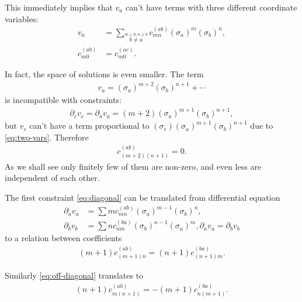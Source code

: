 \documentclass[aps,prd,final,twocolumn,floats,floatfix,nofootinbib,10pt]{revtex4-1}
\begin{document}
This immediately implies that $v_a$ can't have terms with three different
coordinate variables:
\begin{align}
  v_a & = \sum_{\overset{m \geq 0, n \geq 0}{b \neq a}}
  c^{(ab)}_{mn} (\sigma_a)^m (\sigma_b)^n, \\
  c^{(ab)}_{m0} & = c^{(ac)}_{m0}.
\end{align}

In fact, the space of solutions is even smaller. The term
\begin{align}
  v_a = (\sigma_a)^{m + 2} (\sigma_b)^{n + 1} + \cdots
\end{align}
is incompatible with constraints:
\begin{align}
  \partial_c v_c = \partial_a v_a =
    (m + 2) (\sigma_a)^{m + 1} (\sigma_b)^{n + 1},
\end{align}
but $v_c$ can't have a term proportional to
$(\sigma_c) (\sigma_a)^{m + 1} (\sigma_b)^{n + 1}$ due to \eqref{eq:two-vars}.
Therefore
\begin{align} \label{eq:corner}
  c^{(ab)}_{(m + 2)(n + 1)} = 0.
\end{align}
As we shall see only finitely few of them are non-zero, and even less
are independent of each other.

The first constraint \eqref{eq:diagonal} can be translated from differential
equation
\begin{align}
  \partial_a v_a & = \sum m c^{(ab)}_{mn} (\sigma_a)^{m - 1} (\sigma_b)^n, \\
  \partial_b v_b & = \sum n c^{(ba)}_{nm} (\sigma_b)^{n - 1} (\sigma_a)^m,
  \partial_a v_a = \partial_b v_b
\end{align}
to a relation between coefficients
\begin{align} \label{eq:first-rel}
  (m + 1) c^{(ab)}_{(m + 1) n} = (n+1) c^{(ba)}_{(n + 1) m}.
\end{align}

Similarly \eqref{eq:off-diagonal} translates to
\begin{align} \label{eq:second-rel}
  (n + 1) c^{(ab)}_{m (n + 1)} = -(m + 1) c^{(ba)}_{n (m + 1)}.
\end{align}
\end{document}
